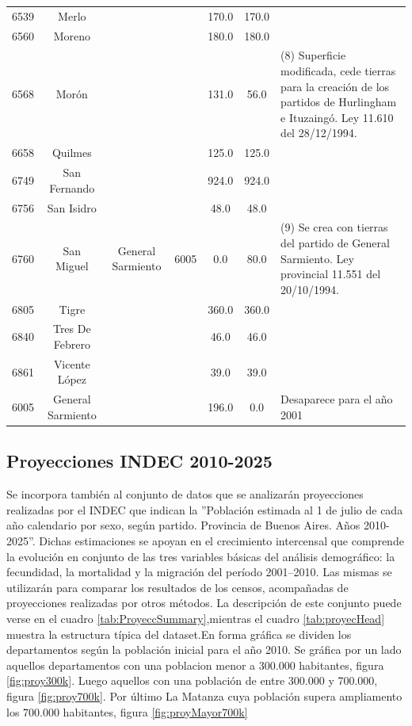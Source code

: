 \documentclass{article}
\theoremstyle{mytheoremstyle}
\theoremstyle{mytheoremstyle}
\theoremstyle{myproblemstyle}
\begin{document}
\begin{table}[htbp]
\begin{tabular}{|c|c|c|c|c|c|p{5cm}|}
        6539 & Merlo             && & 170.0             & 170.0 &   \\
        6560 & Moreno              &&& 180.0             & 180.0 & \\
        6568 & Morón                &&& 131.0             & 56.0  & (8) Superficie  modificada, cede tierras para la creación de los partidos de Hurlingham e Ituzaingó. Ley 11.610 del 28/12/1994.\\
        6658 & Quilmes            && & 125.0             & 125.0 &       \\
        6749 & San Fernando       && & 924.0             & 924.0 &    \\
        6756 & San Isidro         && & 48.0              & 48.0  &    \\
        6760 & San Miguel          & General Sarmiento & 6005  & 0.0 & 80.0 & (9) Se crea con tierras del partido de General Sarmiento. Ley provincial 11.551 del 20/10/1994. \\
        6805 & Tigre            &&   & 360.0             & 360.0 &     \\
        6840 & Tres De Febrero   &&  & 46.0              & 46.0  &      \\
        6861 & Vicente López     &&  & 39.0              & 39.0  &  \\
        6005 & General Sarmiento  && & 196.0             & 0.0   & Desaparece para el año 2001   \\        
     \hline
    \end{tabular}
    \label{tab:DimDepto}
\end{table}

\subsection{Proyecciones INDEC 2010-2025}
Se incorpora también al conjunto de datos que se analizarán proyecciones realizadas por el INDEC
que indican la ''Población estimada al 1 de julio de
 cada año calendario por sexo, según partido. Provincia de Buenos Aires. Años 2010-2025''.
 Dichas estimaciones se apoyan en el crecimiento intercensal que comprende la evolución en conjunto
 de las tres variables básicas del análisis demográfico: la fecundidad, la mortalidad y la migración del período
 2001--2010.  Las mismas se utilizarán para comparar los resultados de los censos, acompañadas de
 proyecciones realizadas por otros métodos.\newline
 La  descripción de este conjunto  puede verse en el cuadro \ref{tab:ProyeccSummary},mientras el cuadro \ref{tab:proyecHead} muestra la estructura típica del 
 dataset.En forma gráfica se dividen los departamentos según la población inicial para el año 2010. 
 Se gráfica por un lado aquellos
 departamentos con una poblacion menor a 300.000 habitantes, 
 figura \ref{fig:proy300k}. Luego aquellos con una población de entre 300.000 y 700.000,
  figura \ref{fig:proy700k}. Por último La Matanza cuya población supera ampliamento los 700.000 habitantes,
   figura \ref{fig:proyMayor700k}
\end{document}
